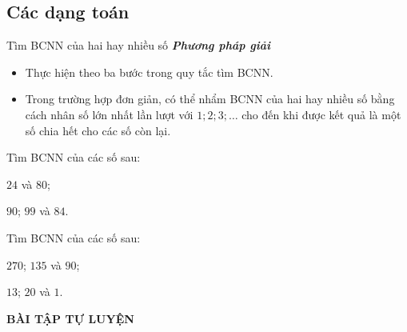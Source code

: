 \subsection{Các dạng toán}
\begin{dang}{Tìm BCNN của hai hay nhiều số}
	\textit{\textbf{Phương pháp giải}}
	\begin{itemize}
		\item Thực hiện theo ba bước trong quy tắc tìm BCNN.
		\item Trong trường hợp đơn giản, có thể nhẩm BCNN của hai hay nhiều số bằng cách nhân số lớn nhất lần lượt với $1; 2; 3; \ldots$ cho đến khi được kết quả là một số chia hết cho các số còn lại.
	\end{itemize}
\end{dang}
\begin{vd}
	Tìm BCNN của các số sau:
	\begin{enumEX}{2}
		\item $24$ và $80$;
		\item $90$; $99$ và $84$.
	\end{enumEX}
\end{vd}
\begin{vd}
	Tìm BCNN của các số sau:
	\begin{enumEX}{2}
		\item $270$; $135$ và $90$;
		\item $13$; $20$ và $1$.
	\end{enumEX}
\end{vd}
\begin{center}
	\textbf{BÀI TẬP TỰ LUYỆN}
\end{center}
